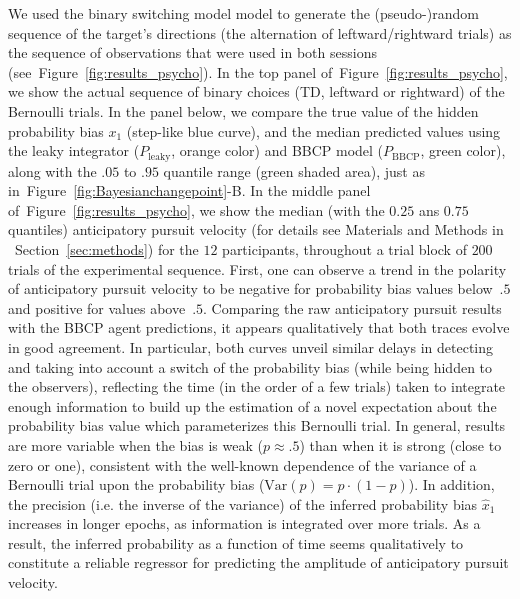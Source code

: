 \documentclass[10pt,letterpaper]{article}
\newcommand{\seeFig}[1]{Figure~\ref{fig:#1}}
\newcommand{\seeSec}[1]{Section~\ref{sec:#1}}
\begin{document}
We used the binary switching model model to generate the (pseudo-)random sequence of
the target's directions (the alternation of leftward/rightward trials)
as the sequence of observations that were used in both sessions
(see~\seeFig{results_psycho}).
In the top panel  of~\seeFig{results_psycho}, we show the actual sequence of binary choices
(TD, leftward or rightward) of the Bernoulli trials.
In the panel below, we compare %
the true value of the hidden probability bias $x_1$ (step-like blue curve),
and the median predicted values using the leaky integrator ($P_{\text{leaky}}$, orange color) and BBCP model ($P_{\text{BBCP}}$, green color),
along with the $.05$ to $.95$ quantile range (green shaded area),
just as in~\seeFig{Bayesianchangepoint}-B.
In the middle panel of~\seeFig{results_psycho}, we show the median (with the $0.25$ ans $0.75$ quantiles) anticipatory pursuit velocity (for details see Materials and Methods in ~\seeSec{methods})
for the $12$ participants, throughout a trial block of $200$ trials of the experimental sequence.
First, one can observe a trend in the polarity of anticipatory pursuit velocity
to be negative for probability bias values below~$.5$ and positive for values above~$.5$.
Comparing the raw anticipatory pursuit results with the BBCP agent predictions,
it appears qualitatively that both traces evolve in good agreement.
In particular, both curves unveil similar delays in detecting and
taking into account a switch of the probability bias (while being hidden to the observers),
reflecting the time (in the order of a few trials) taken to integrate enough information
to build up the estimation of a novel expectation about the probability bias value
which parameterizes this Bernoulli trial.
In general, results are more variable when the bias is weak ($p\approx .5$)
than when it is strong (close to zero or one),
consistent with the well-known dependence of the variance of a Bernoulli trial
upon the probability bias ($\textrm{Var}(p)= p \cdot (1-p)$).
In addition, the precision (i.e. the inverse of the variance)
of the inferred probability bias $\hat{x}_1$ increases
in longer epochs, as information is integrated over more trials.
As a result, the inferred probability as a function of time
seems qualitatively to constitute a reliable regressor
for predicting the amplitude of anticipatory pursuit velocity.
\end{document}
